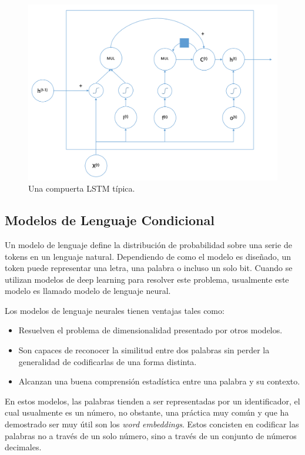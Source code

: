    	\begin{figure}
   		\centering
   		\includegraphics[width=\textwidth]{capitulo2/images/lstm}
   		\caption{Una compuerta LSTM típica.}
   		\label{fig:lstm}
   	\end{figure}
   	
	
	\subsection{Modelos de Lenguaje Condicional}

	Un modelo de lenguaje define la distribución de probabilidad sobre una serie de tokens en un lenguaje natural. Dependiendo de como el modelo es diseñado, un token puede representar una letra, una palabra o incluso un solo bit. Cuando se utilizan modelos de deep learning para resolver este problema, usualmente este modelo es llamado modelo de lenguaje neural.

	Los modelos de lenguaje neurales tienen ventajas tales como:
	\begin{itemize}
		\item Resuelven el problema de dimensionalidad presentado por otros modelos.
		\item Son capaces de reconocer la similitud entre dos palabras sin perder la generalidad de codificarlas de una forma distinta.
		\item Alcanzan una buena comprensión estadística entre una palabra y su contexto.
	\end{itemize}

	En estos modelos, las palabras tienden a ser representadas por un identificador, el cual usualmente es un número, no obstante, una práctica muy común y que ha demostrado ser muy útil son los \textit{word embeddings}. Estos concisten en codificar las palabras no a través de un solo número, sino a través de un conjunto de números decimales.

